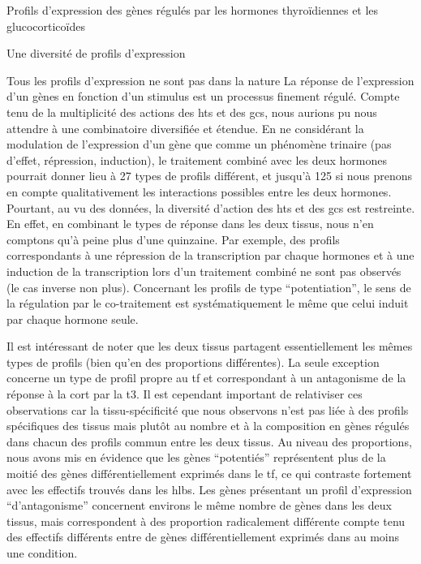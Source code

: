 \documentclass[../main.tex]{subfiles}
\begin{document}
\begin{chapter}{Profils d'expression des gènes régulés par les hormones thyroïdiennes et les glucocorticoïdes}


\begin{section}{Une diversité de profils d'expression}

\begin{subsection}{Tous les profils d'expression ne sont pas dans la nature}
La réponse de l'expression d'un gènes en fonction d'un stimulus est un processus finement régulé.
Compte tenu de la multiplicité des actions des \glspl{ht} et des \glspl{gc}, nous aurions pu nous attendre à une combinatoire diversifiée et étendue.
En ne considérant la modulation de l'expression d'un gène que comme un phénomène trinaire (pas d'effet, répression, induction), le traitement combiné avec les deux hormones pourrait donner lieu à 27 types de profils différent, et jusqu'à 125 si nous prenons en compte qualitativement les interactions possibles entre les deux hormones.
Pourtant, au vu des données, la diversité d'action des \glspl{ht} et des \glspl{gc} est restreinte.
En effet, en combinant le types de réponse dans les deux tissus, nous n'en comptons qu'à peine plus d'une quinzaine.
Par exemple, des profils correspondants à une répression de la transcription par chaque hormones et à une induction de la transcription lors d'un traitement combiné ne sont pas observés (le cas inverse non plus).
Concernant les profils de type ``potentiation'', le sens de la régulation par le co-traitement est systématiquement le même que celui induit par chaque hormone seule.
\par
Il est intéressant de noter que les deux tissus partagent essentiellement les mêmes types de profils (bien qu'en des proportions différentes).
La seule exception concerne un type de profil propre au \gls{tf} et correspondant à un antagonisme de la réponse à la \gls{cort} par la \gls{t3}.
Il est cependant important de relativiser ces observations car la tissu-spécificité que nous observons n'est pas liée à des profils spécifiques des tissus mais plutôt au nombre et à la composition en gènes régulés dans chacun des profils commun entre les deux tissus.
Au niveau des proportions, nous avons mis en évidence que les gènes ``potentiés'' représentent plus de la moitié des gènes différentiellement exprimés dans le \gls{tf}, ce qui contraste fortement avec les effectifs trouvés dans les \glspl{hlb}.
Les gènes présentant un profil d'expression ``d'antagonisme'' concernent environs le même nombre de gènes dans les deux tissus, mais correspondent à des proportion radicalement différente compte tenu des effectifs différents entre de gènes différentiellement exprimés dans au moins une condition.
\end{subsection}


\end{section}
\end{chapter}
\end{document}
